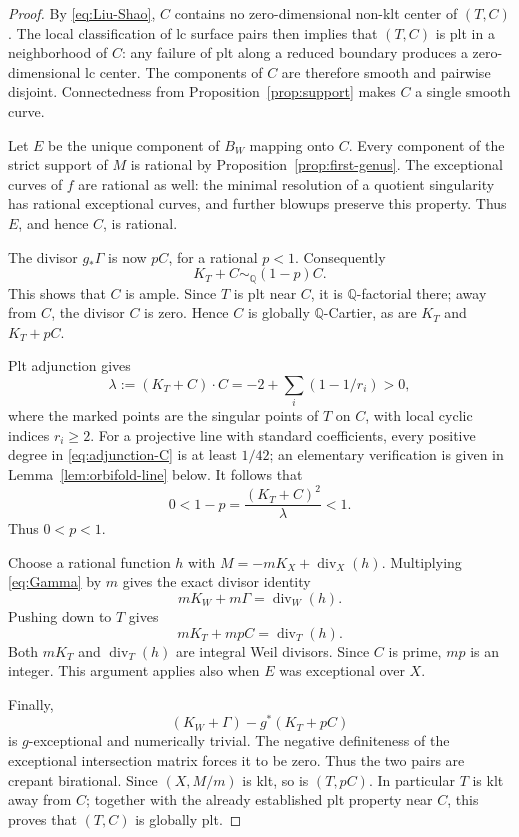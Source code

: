 \documentclass[12pt,a4paper]{article}
\numberwithin{equation}{section}
\theoremstyle{definition}
\newcommand{\Q}{\mathbb Q}
\newcommand{\divi}{\operatorname{div}}
\begin{document}
\begin{proof}
By \eqref{eq:Liu-Shao}, \(C\) contains no zero-dimensional non-klt
center of \((T,C)\).
The local classification of lc surface pairs then implies that
\((T,C)\) is plt in a neighborhood of \(C\): any failure of plt
along a reduced boundary produces a zero-dimensional lc center.
The components of \(C\) are therefore smooth and pairwise disjoint.
Connectedness from Proposition~\ref{prop:support} makes \(C\) a single
smooth curve.

Let \(E\) be the unique component of \(B_W\) mapping onto \(C\).
Every component of the strict support of \(M\) is rational by
Proposition~\ref{prop:first-genus}. The exceptional curves of \(f\)
are rational as well: the minimal resolution of a quotient singularity
has rational exceptional curves, and further blowups preserve this
property. Thus \(E\), and hence \(C\), is rational.

The divisor \(g_*\Gamma\) is now \(pC\), for a rational \(p<1\).
Consequently
\[
              K_T+C\sim_{\Q}(1-p)C.
\]
This shows that \(C\) is ample. Since \(T\) is plt near \(C\),
it is \(\Q\)-factorial there; away from \(C\), the divisor \(C\) is
zero. Hence \(C\) is globally \(\Q\)-Cartier, as are
\(K_T\) and \(K_T+pC\).

Plt adjunction gives
\begin{equation}\label{eq:adjunction-C}
 \lambda:=(K_T+C)\cdot C
          =-2+\sum_i(1-1/r_i)>0,
\end{equation}
where the marked points are the singular points of \(T\) on \(C\),
with local cyclic indices \(r_i\geq2\).
For a projective line with standard coefficients, every positive
degree in \eqref{eq:adjunction-C} is at least \(1/42\);
an elementary verification is given in
Lemma~\ref{lem:orbifold-line} below.
It follows that
\[
 0<1-p=\frac{(K_T+C)^2}{\lambda}<1.
\]
Thus \(0<p<1\).

Choose a rational function \(h\) with
\(M=-mK_X+\divi_X(h)\).
Multiplying \eqref{eq:Gamma} by \(m\) gives the exact divisor identity
\[
                       mK_W+m\Gamma=\divi_W(h).
\]
Pushing down to \(T\) gives
\begin{equation}\label{eq:mp-integral}
                        mK_T+mpC=\divi_T(h).
\end{equation}
Both \(mK_T\) and \(\divi_T(h)\) are integral Weil divisors.
Since \(C\) is prime, \(mp\) is an integer.
This argument applies also when \(E\) was exceptional over \(X\).

Finally,
\[
             (K_W+\Gamma)-g^*(K_T+pC)
\]
is \(g\)-exceptional and numerically trivial.
The negative definiteness of the exceptional intersection matrix
forces it to be zero.
Thus the two pairs are crepant birational.
Since \((X,M/m)\) is klt, so is \((T,pC)\).
In particular \(T\) is klt away from \(C\); together with the
already established plt property near \(C\), this proves that
\((T,C)\) is globally plt.
\end{proof}
\end{document}
